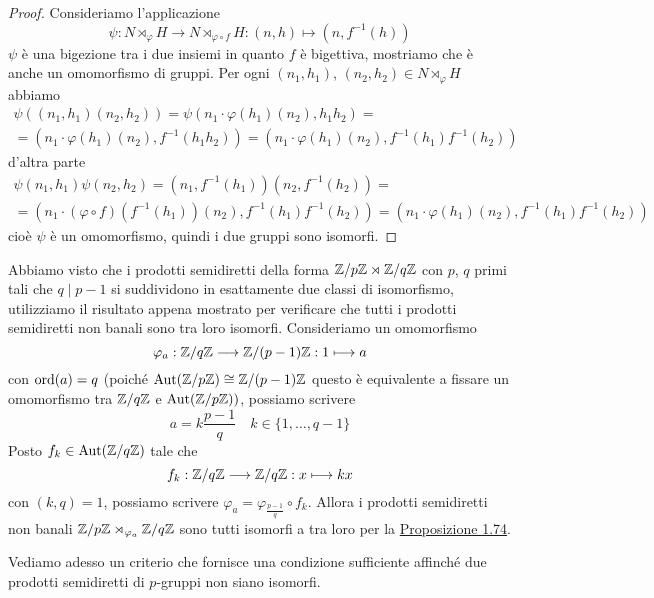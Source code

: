 \documentclass[11pt]{scrartcl}
\begin{document}
\begin{proof}
    Consideriamo l'applicazione
    \[
        \psi: N\rtimes_{\varphi}H \longrightarrow N\rtimes_{\varphi\circ f}H:
        (n, h) \longmapsto (n, f^{-1}(h))
    \]
    $\psi$ è una bigezione tra i due insiemi in quanto $f$ è bigettiva,
    mostriamo che è anche un omomorfismo di gruppi. Per ogni $(n_1, h_1)$, $(n_2, h_2)
    \in N\rtimes_{\varphi}H$ abbiamo
    \begin{multline*}
        \psi((n_1, h_1)(n_2, h_2)) = \psi(n_1\cdot\varphi(h_1)(n_2), h_1h_2) = \\
        = (n_1\cdot\varphi(h_1)(n_2), f^{-1}(h_1h_2)) = (n_1\cdot\varphi(h_1)(n_2), f^{-1}(h_1)f^{-1}(h_2))
    \end{multline*}
    d'altra parte
    \begin{multline*}
        \psi(n_1, h_1)\psi(n_2, h_2) = (n_1, f^{-1}(h_1))(n_2, f^{-1}(h_2)) =\\
        = (n_1\cdot(\varphi\circ f)(f^{-1}(h_1))(n_2), f^{-1}(h_1)f^{-1}(h_2)) = 
        (n_1\cdot \varphi(h_1)(n_2), f^{-1}(h_1)f^{-1}(h_2))
    \end{multline*}
    cioè $\psi$ è un omomorfismo, quindi i due gruppi sono isomorfi.
\end{proof}

\begin{example}
    Abbiamo visto che i prodotti semidiretti della forma ${\mathbb Z}/p{\mathbb Z} \rtimes\mathbb{Z}/{q}\mathbb{Z}$
    con $p$, $q$ primi tali che $q \mid p - 1$ si suddividono in esattamente
    due classi di isomorfismo, utilizziamo il risultato appena mostrato 
    per verificare che tutti i prodotti semidiretti non banali sono tra loro 
    isomorfi. Consideriamo un omomorfismo
    \[
        \varphi_a: \mathbb{Z}/{q}\mathbb{Z}\longrightarrow \mathbb{Z}/{(p - 1)}\mathbb{Z} : 1 \longmapsto a
    \]
    con $\operatorname{ord}(a) = q$ (poiché $\operatorname{Aut}({\mathbb Z}/p{\mathbb Z}) \cong \mathbb{Z}/{(p - 1)}\mathbb{Z}$
    questo è equivalente a fissare un omomorfismo tra $\mathbb{Z}/{q}\mathbb{Z}$ e $\operatorname{Aut}({\mathbb Z}/p{\mathbb Z}))$,
    possiamo scrivere 
    \[
        a = k\frac{p - 1}{q}\quad k \in \{1, \ldots, q - 1\}
    \]
    Posto $f_k \in \operatorname{Aut}(\mathbb{Z}/{q}\mathbb{Z})$ tale che
    \[
        f_k :\mathbb{Z}/{q}\mathbb{Z}\longrightarrow\mathbb{Z}/{q}\mathbb{Z}: x \longmapsto kx
    \]
    con $(k, q) = 1$, possiamo scrivere 
    $\varphi_a = \varphi_{\frac{p - 1}{q}}\circ f_k$. Allora i prodotti
    semidiretti non banali ${\mathbb Z}/p{\mathbb Z}\rtimes_{\varphi_a}\mathbb{Z}/{q}\mathbb{Z}$ sono tutti isomorfi
    a tra loro per la \hyperref[prop1.74]{Proposizione 1.74}.
\end{example}

Vediamo adesso un criterio che fornisce una condizione sufficiente affinché
due prodotti semidiretti di $p$-gruppi non siano isomorfi.
\end{document}
